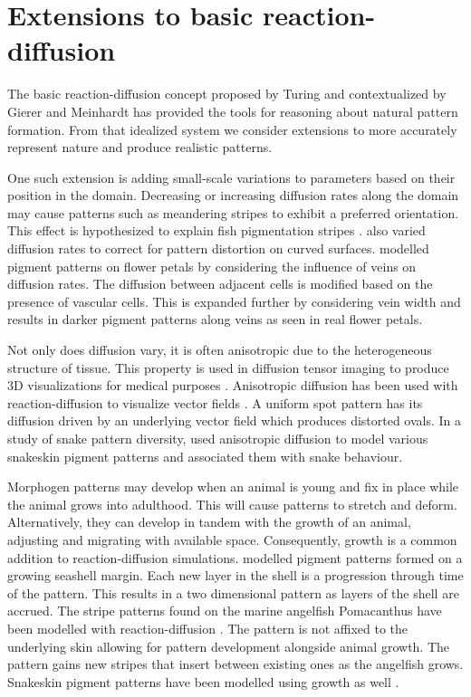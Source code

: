 \section{Extensions to basic reaction-diffusion}
The basic reaction-diffusion concept proposed by Turing and contextualized by Gierer and Meinhardt has provided the tools for reasoning about natural pattern formation. From that idealized system we consider extensions to more accurately represent nature and produce realistic patterns.

One such extension is adding small-scale variations to parameters based on their position in the domain. Decreasing or increasing diffusion rates along the domain may cause patterns such as meandering stripes to exhibit a preferred orientation. This effect is hypothesized to explain fish pigmentation stripes \citep{zheng2009}. \citet{witkin1991} also varied diffusion rates to correct for pattern distortion on curved surfaces. \citet{zhou2007} modelled pigment patterns on flower petals by considering the influence of veins on diffusion rates. The diffusion between adjacent cells is modified based on the presence of vascular cells. This is expanded further by considering vein width and results in darker pigment patterns along veins as seen in real flower petals.

Not only does diffusion vary, it is often anisotropic due to the heterogeneous structure of tissue. This property is used in diffusion tensor imaging to produce 3D visualizations for medical purposes \citep{bihan2001}. Anisotropic diffusion has been used with reaction-diffusion to visualize vector fields \citep{sanderson2004}. A uniform spot pattern has its diffusion driven by an underlying vector field which produces distorted ovals. In a study of snake pattern diversity, \citet{allen2013} used anisotropic diffusion to model various snakeskin pigment patterns and associated them with snake behaviour.

Morphogen patterns may develop when an animal is young and fix in place while the animal grows into adulthood. This will cause patterns to stretch and deform. Alternatively, they can develop in tandem with the growth of an animal, adjusting and migrating with available space. Consequently, growth is a common addition to reaction-diffusion simulations. \citet{fowler1992} modelled pigment patterns formed on a growing seashell margin. Each new layer in the shell is a progression through time of the pattern. This results in a two dimensional pattern as layers of the shell are accrued. The stripe patterns found on the marine angelfish Pomacanthus have been modelled with reaction-diffusion \citep{kondo1995}. The pattern is not affixed to the underlying skin allowing for pattern development alongside animal growth. The pattern gains new stripes that insert between existing ones as the angelfish grows. Snakeskin pigment patterns have been modelled using growth as well \citep{murray1991}.

